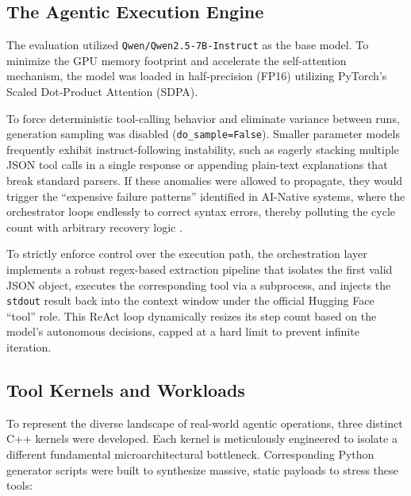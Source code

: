 \documentclass[10pt, letterpaper]{article}
\begin{document}
\subsection{The Agentic Execution Engine}
The evaluation utilized \texttt{Qwen/Qwen2.5-7B-Instruct} as the base model. To minimize the GPU memory footprint and accelerate the self-attention mechanism, the model was loaded in half-precision (FP16) utilizing PyTorch's Scaled Dot-Product Attention (SDPA). 

To force deterministic tool-calling behavior and eliminate variance between runs, generation sampling was disabled (\texttt{do\_sample=False}). Smaller parameter models frequently exhibit instruct-following instability, such as eagerly stacking multiple JSON tool calls in a single response or appending plain-text explanations that break standard parsers. If these anomalies were allowed to propagate, they would trigger the ``expensive failure patterns'' identified in AI-Native systems, where the orchestrator loops endlessly to correct syntax errors, thereby polluting the cycle count with arbitrary recovery logic \cite{ai_nativebench}. 

To strictly enforce control over the execution path, the orchestration layer implements a robust regex-based extraction pipeline that isolates the first valid JSON object, executes the corresponding tool via a subprocess, and injects the \texttt{stdout} result back into the context window under the official Hugging Face ``tool'' role. This ReAct loop dynamically resizes its step count based on the model's autonomous decisions, capped at a hard limit to prevent infinite iteration.

\subsection{Tool Kernels and Workloads}
To represent the diverse landscape of real-world agentic operations, three distinct C++ kernels were developed. Each kernel is meticulously engineered to isolate a different fundamental microarchitectural bottleneck. Corresponding Python generator scripts were built to synthesize massive, static payloads to stress these tools:
\end{document}
